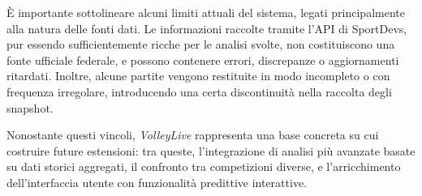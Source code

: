 \documentclass[a4paper,12pt]{report}
\begin{document}
È importante sottolineare alcuni limiti attuali del sistema, legati principalmente alla natura delle fonti dati. Le informazioni raccolte tramite l’API di SportDevs, pur essendo sufficientemente ricche per le analisi svolte, non costituiscono una fonte ufficiale federale, e possono contenere errori, discrepanze o aggiornamenti ritardati. Inoltre, alcune partite vengono restituite in modo incompleto o con frequenza irregolare, introducendo una certa discontinuità nella raccolta degli snapshot.

Nonostante questi vincoli, \textit{VolleyLive} rappresenta una base concreta su cui costruire future estensioni: tra queste, l’integrazione di analisi più avanzate basate su dati storici aggregati, il confronto tra competizioni diverse, e l’arricchimento dell’interfaccia utente con funzionalità predittive interattive.
\end{document}
